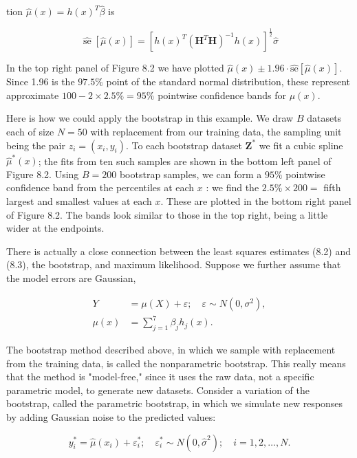 \documentclass[10pt]{article}
\begin{document}
tion $\hat{\mu}(x)=h(x)^{T} \hat{\beta}$ is


\begin{equation*}
\widehat{\operatorname{se}}[\hat{\mu}(x)]=\left[h(x)^{T}\left(\mathbf{H}^{T} \mathbf{H}\right)^{-1} h(x)\right]^{\frac{1}{2}} \hat{\sigma} \tag{8.4}
\end{equation*}


In the top right panel of Figure 8.2 we have plotted $\hat{\mu}(x) \pm 1.96 \cdot \widehat{\mathrm{se}}[\hat{\mu}(x)]$. Since 1.96 is the $97.5 \%$ point of the standard normal distribution, these represent approximate $100-2 \times 2.5 \%=95 \%$ pointwise confidence bands for $\mu(x)$.

Here is how we could apply the bootstrap in this example. We draw $B$ datasets each of size $N=50$ with replacement from our training data, the sampling unit being the pair $z_{i}=\left(x_{i}, y_{i}\right)$. To each bootstrap dataset $\mathbf{Z}^{*}$ we fit a cubic spline $\hat{\mu}^{*}(x)$; the fits from ten such samples are shown in the bottom left panel of Figure 8.2. Using $B=200$ bootstrap samples, we can form a $95 \%$ pointwise confidence band from the percentiles at each $x$ : we find the $2.5 \% \times 200=$ fifth largest and smallest values at each $x$. These are plotted in the bottom right panel of Figure 8.2. The bands look similar to those in the top right, being a little wider at the endpoints.

There is actually a close connection between the least squares estimates (8.2) and (8.3), the bootstrap, and maximum likelihood. Suppose we further assume that the model errors are Gaussian,


\begin{align*}
Y & =\mu(X)+\varepsilon ; \quad \varepsilon \sim N\left(0, \sigma^{2}\right), \\
\mu(x) & =\sum_{j=1}^{7} \beta_{j} h_{j}(x) . \tag{8.5}
\end{align*}


The bootstrap method described above, in which we sample with replacement from the training data, is called the nonparametric bootstrap. This really means that the method is "model-free," since it uses the raw data, not a specific parametric model, to generate new datasets. Consider a variation of the bootstrap, called the parametric bootstrap, in which we simulate new responses by adding Gaussian noise to the predicted values:


\begin{equation*}
y_{i}^{*}=\hat{\mu}\left(x_{i}\right)+\varepsilon_{i}^{*} ; \quad \varepsilon_{i}^{*} \sim N\left(0, \hat{\sigma}^{2}\right) ; \quad i=1,2, \ldots, N . \tag{8.6}
\end{equation*}
\end{document}
